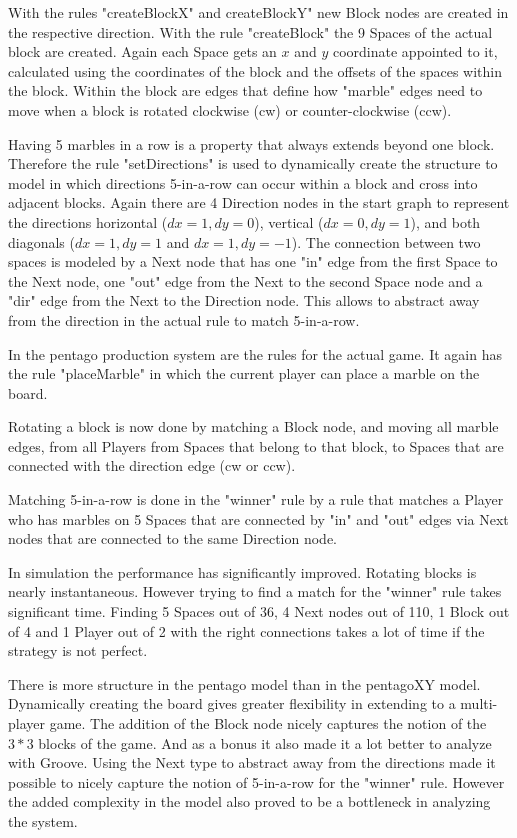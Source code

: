 With the rules "createBlockX" and createBlockY" new Block nodes are created in the respective direction.
With the rule "createBlock" the 9 Spaces of the actual block are created. Again each Space gets an $x$ and $y$ coordinate appointed to it, calculated using the coordinates of the block and the offsets of the spaces within the block.
Within the block are edges that define how "marble" edges need to move when a block is rotated clockwise (cw) or counter-clockwise (ccw).

Having 5 marbles in a row is a property that always extends beyond one block.
Therefore the rule "setDirections" is used to dynamically create the structure to model in which directions 5-in-a-row can occur within a block and cross into adjacent blocks.
Again there are 4 Direction nodes in the start graph to represent the directions horizontal ($dx=1,dy=0$), vertical ($dx=0,dy=1$), and both diagonals ($dx=1,dy=1$ and $dx=1,dy=-1$). 
The connection between two spaces is modeled by a Next node that has one "in" edge from the first Space to the Next node, one "out" edge from the Next to the second Space node and a "dir" edge from the Next to the Direction node. This allows to abstract away from the direction in the actual rule to match 5-in-a-row.

In the pentago production system are the rules for the actual game.
It again has the rule "placeMarble" in which the current player can place a marble on the board.

Rotating a block is now done by matching a Block node, and moving all marble edges, from all Players from Spaces that belong to that block, to Spaces that are connected with the direction edge (cw or ccw).

Matching 5-in-a-row is done in the "winner" rule by a rule that matches a Player who has marbles on 5 Spaces that are connected by "in" and "out" edges via Next nodes that are connected to the same Direction node.

In simulation the performance has significantly improved. Rotating blocks is nearly instantaneous. 
However trying to find a match for the "winner" rule takes significant time. 
Finding 5 Spaces out of 36, 4 Next nodes out of 110, 1 Block out of 4 and 1 Player out of 2 with the right connections takes a lot of time if the strategy is not perfect.

There is more structure in the pentago model than in the pentagoXY model. Dynamically creating the board gives greater flexibility in extending to a multi-player game.
The addition of the Block node nicely captures the notion of the $3*3$ blocks of the game. And as a bonus it also made it a lot better to analyze with Groove.
Using the Next type to abstract away from the directions made it possible to nicely capture the notion of 5-in-a-row for the "winner" rule. However the added complexity in the model also proved to be a bottleneck in analyzing the system.

